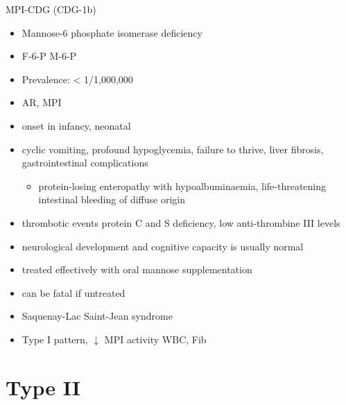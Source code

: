 \documentclass[presentation, smaller]{beamer}
\begin{document}
\begin{frame}[label={sec:org13b6b89}]{MPI-CDG (CDG-1b)}
\begin{itemize}
\item Mannose-6 phosphate isomerase deficiency
\item F-6-P \ce{<=>} M-6-P

\item Prevalence: \textless{} 1/1,000,000
\item AR, MPI
\item onset in infancy, neonatal

\item cyclic vomiting, profound hypoglycemia, failure to thrive, liver
fibrosis, gastrointestinal complications
\begin{itemize}
\item protein-losing enteropathy with hypoalbuminaemia, life-threatening
intestinal bleeding of diffuse origin
\end{itemize}
\item thrombotic events protein C and S deficiency, low anti-thrombine III levels
\item neurological development and cognitive capacity is usually normal
\item \alert{treated effectively with oral mannose supplementation}
\item can be fatal if untreated
\item Saquenay-Lac Saint-Jean syndrome
\item Type I pattern, \(\downarrow\) MPI activity WBC, Fib
\end{itemize}
\end{frame}

\section{Type II}
\label{sec:org9d59fe9}
\end{document}
